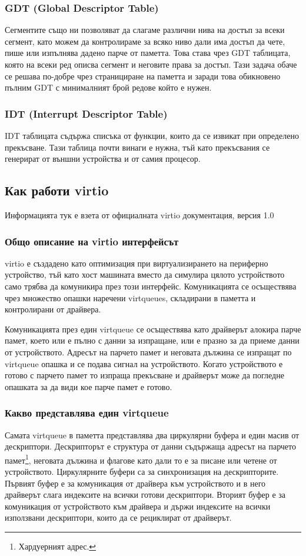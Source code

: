 \subsubsection{GDT (Global Descriptor Table)} \label{gdt}
Сегментите също ни позволяват да слагаме различни нива на достъп за всеки сегмент, като можем да контролираме за всяко ниво дали има достъп да чете, пише или изпълнява дадено парче от паметта. Това става чрез GDT таблицата, която на всеки ред описва сегмент и неговите права за достъп. Тази задача обаче се решава по-добре чрез странициране на паметта и заради това обикновено пълним GDT с минималният брой редове който е нужен.

\subsubsection{IDT (Interrupt Descriptor Table)} \label{idt}
IDT таблицата съдържа списъка от функции, които да се извикат при определено прекъсване. Тази таблица почти винаги е нужна, тъй като прекъсвания се генерират от външни устройства и от самия процесор.

\subsection{Как работи virtio}
Информацията тук е взета от официалната virtio документация, версия 1.0\parencite{virtiodocs}
\subsubsection{Общо описание на virtio интерфейсът}
virtio е създадено като оптимизация при виртуализирането на периферно устройство, тъй като хост машината вместо да симулира цялото устройството само трябва да комуникира през този интерфейс. Комуникацията се осъществява чрез множество опашки наречени virtqueues, складирани в паметта и контролирани от драйвера.

Комуникацията през един virtqueue се осъществява като драйверът алокира парче памет, което или е пълно с данни за изпращане, или е празно за да приеме данни от устройството. Адресът на парчето памет и неговата дължина се изпращат по virtqueue опашка и се подава сигнал на устройството. Когато устройството е готово с парчето памет то изпраща прекъсване и драйверът може да погледне опашката за да види кое парче памет е готово.

\subsubsection{Какво представлява един virtqueue}
Самата virtqueue в паметта представлява два циркулярни буфера и един масив от дескриптори. Дескрипторът е структура от данни съдържаща адресът на парчето памет\footnote{Хардуерният адрес.}, неговата дължина и флагове като дали то е за писане или четене от устройството. Циркулярните буфери са за синхронизация на дескрипторите. Първият буфер е за комуникация от драйвера към устройството и в него драйверът слага индексите на всички готови дескриптори. Вторият буфер е за комуникация от устройството към драйвера и държи индексите на всички използвани дескриптори, които да се рециклират от драйверът.


